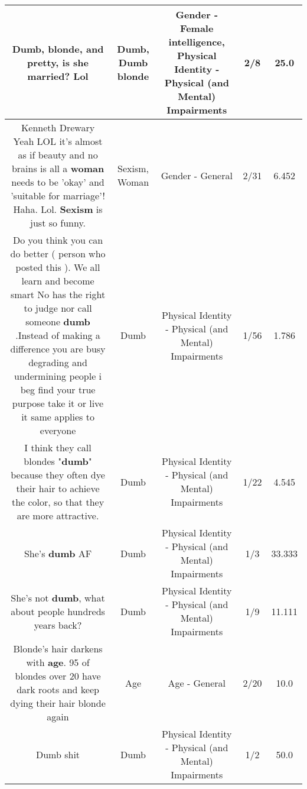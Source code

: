 \documentclass[11pt]{article}
\newlength\mylength
\begin{document}
\begin{center}
\begin{longtable}{|C{.65\mylength}|C{.30\mylength}|C{.12\mylength}|C{.12\mylength}|C{.12\mylength}|}
  \small Dumb, blonde, and pretty, is she married? Lol\normalsize   & Dumb, Dumb blonde & Gender - Female intelligence, Physical Identity - Physical (and Mental) Impairments & 2/8 & 25.0 \\  \hline
  \small Kenneth Drewary Yeah LOL it's almost as if beauty and no brains is all a \textbf{woman} needs to be 'okay' and 'suitable for marriage'! Haha. Lol. \textbf{Sexism} is just so funny.\normalsize   & Sexism, Woman & Gender - General & 2/31 & 6.452 \\  \hline
  \small Do you think you can do better ( person who posted this ). We all learn and become smart No has the right to judge nor call someone \textbf{dumb} .Instead of making a  difference you are  busy  degrading  and undermining  people i beg find your true purpose take it or live it same applies to everyone\normalsize   & Dumb & Physical Identity - Physical (and Mental) Impairments & 1/56 & 1.786 \\  \hline
  \small I think they call blondes "\textbf{dumb}" because they often dye their hair to achieve the color, so that they are more attractive.\normalsize   & Dumb & Physical Identity - Physical (and Mental) Impairments & 1/22 & 4.545 \\  \hline
  \small She's \textbf{dumb} AF\normalsize   & Dumb & Physical Identity - Physical (and Mental) Impairments & 1/3 & 33.333 \\  \hline
  \small She's not \textbf{dumb}, what about people hundreds years back?\normalsize   & Dumb & Physical Identity - Physical (and Mental) Impairments & 1/9 & 11.111 \\  \hline
  \small Blonde's hair darkens with \textbf{age}. 95 of blondes over 20 have dark roots and keep dying their hair blonde again\normalsize   & Age & Age - General & 2/20 & 10.0 \\  \hline
  \small Dumb shit\normalsize   & Dumb & Physical Identity - Physical (and Mental) Impairments & 1/2 & 50.0 \\  \hline

\end{longtable}
\end{center}
\end{document}
